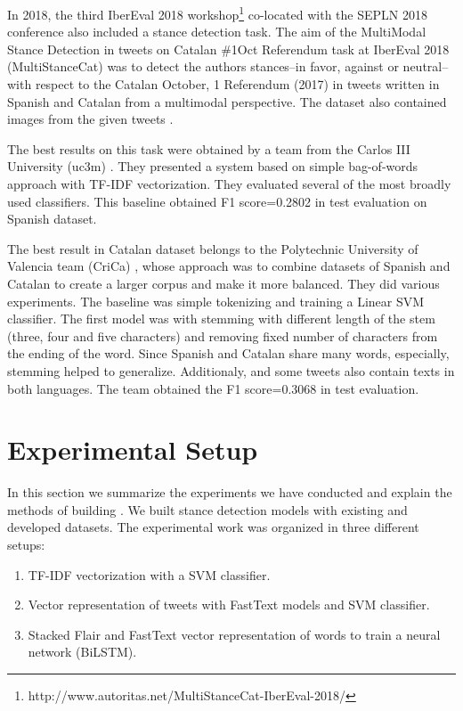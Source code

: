\documentclass[10pt, a4paper]{article}
\begin{document}
In 2018, the third IberEval 2018 workshop\footnote{http://www.autoritas.net/MultiStanceCat-IberEval-2018/} co-located with the SEPLN 2018 conference also included a stance detection task. The aim of the MultiModal Stance Detection in tweets on Catalan \#1Oct Referendum task at IberEval 2018 (MultiStanceCat) was to detect the authors stances--in favor, against or neutral-- with respect to the Catalan October, 1 Referendum (2017) in tweets written in Spanish and Catalan from a multimodal perspective. The dataset also contained images from the given tweets \cite{taule18}.

The best results on this task were obtained by a team from the Carlos III University (uc3m) \cite{Segura-Bedmar18}. They presented a system based on simple bag-of-words approach with TF-IDF vectorization. They evaluated several of the most broadly used classifiers. This baseline obtained F1 score=0.2802 in test evaluation on Spanish dataset. 


The best result in Catalan dataset belongs to the Polytechnic University of Valencia team (CriCa) \cite{Cuquerella2018CriCaTM}, whose approach was to combine datasets of Spanish and Catalan to create a larger corpus and make it more balanced. They did various experiments. The baseline was simple tokenizing and training a Linear SVM classifier. The first model was with stemming with different length of the stem (three, four and five characters) and removing fixed number of characters from the ending of the word. Since Spanish and Catalan share many words, especially, stemming helped to generalize. Additionaly, and some tweets also contain texts in both languages. The team obtained the F1 score=0.3068 in test evaluation. 

\section{Experimental Setup}
\label{sec:experiment}

In this section we summarize the experiments we have conducted and explain the methods of building . We built stance detection models with existing and developed datasets. The experimental work was organized in three different setups: 

\begin{enumerate} 
\item TF-IDF vectorization with a SVM classifier. 
\item Vector representation of tweets with FastText models and SVM classifier.
\item Stacked Flair and FastText vector representation of words to train a neural network (BiLSTM). 
\end{enumerate}
\end{document}
